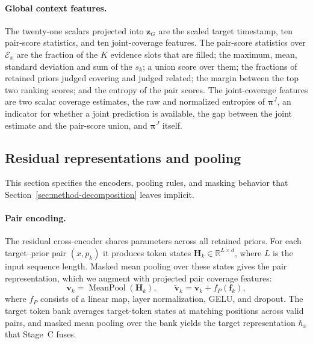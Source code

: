 \paragraph{Global context features.}
The twenty-one scalars projected into $\boldsymbol{z}_G$ are the scaled target
timestamp, ten pair-score statistics, and ten joint-coverage features. The
pair-score statistics over $\mathcal{E}_x$ are the fraction of the $K$
evidence slots that are filled; the maximum, mean, standard deviation and sum
of the $s_k$; a union score over them; the fractions of retained priors judged
covering and judged related; the margin between the top two ranking scores;
and the entropy of the pair scores. The joint-coverage features are two
scalar coverage estimates, the raw and normalized entropies of
$\boldsymbol{\pi}^{J}$, an indicator for whether a joint prediction is
available, the gap between the joint estimate and the pair-score union, and
$\boldsymbol{\pi}^{J}$ itself.

\subsection{Residual representations and pooling}
\label{app:method-representations}

This section specifies the encoders, pooling rules, and masking behavior that
Section~\ref{sec:method-decomposition} leaves implicit.

\paragraph{Pair encoding.}
The residual cross-encoder shares parameters across all retained priors. For
each target--prior pair $(x,p_k)$ it produces token states
$\boldsymbol{H}_k\in\mathbb{R}^{L\times d}$, where $L$ is the input sequence
length. Masked mean pooling over these states gives the pair representation,
which we augment with projected pair coverage features:
\begin{equation}
 \boldsymbol{v}_k=\operatorname{MeanPool}(\boldsymbol{H}_k),
 \qquad
 \widetilde{\boldsymbol{v}}_k=\boldsymbol{v}_k+f_P(\boldsymbol{f}_k),
\end{equation}
where $f_P$ consists of a linear map, layer normalization, GELU, and dropout.
The target token bank averages target-token states at matching positions
across valid pairs, and masked mean pooling over the bank yields the target
representation $\hbar_x$ that Stage~C fuses.

